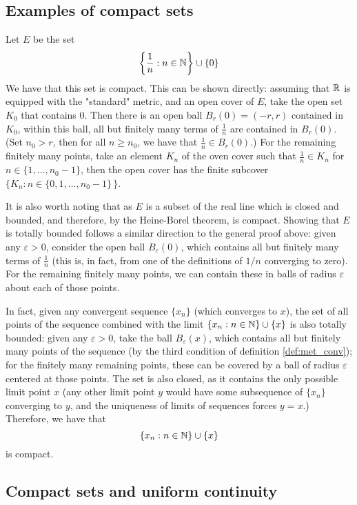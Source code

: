 \subsection{Examples of compact sets}
Let $E$ be the set \[ \left\{ \frac{1}{n} : n\in \mathbb{N} \right\} \cup \{ 0 \} \] We have that this set is compact. This can be shown directly: assuming that $\mathbb{R}$ is equipped with the "standard" metric, and an open cover of $E$, take the open set $K_{0}$ that contains $0$. Then there is an open ball \mbox{$B_{r}(0) = (-r,r)$} contained in $K_{0}$, within this ball, all but finitely many terms of $\frac{1}{n}$ are contained in $B_{r}(0)$. (Set $n_{0}>r$, then for all $n\geq n_{0}$, we have that $\frac{1}{n}\in B_{r}(0)$.) For the remaining finitely many points, take an element $K_{n}$ of the oven cover such that $\frac{1}{n} \in K_{n}$ for $n\in \{1, \ldots, n_{0}-1 \}$, then the open cover has the finite subcover \mbox{$\{K_{n} : n\in \{0,1,\ldots, n_{0} - 1 \} \, \}$}.

It is also worth noting that as $E$ is a subset of the real line which is closed and bounded, and therefore, by the Heine-Borel theorem, is compact. Showing that $E$ is totally bounded follows a similar direction to the general proof above: given any $\varepsilon > 0$, consider the open ball $B_{\varepsilon}(0)$, which contains all but finitely many terms of $\frac{1}{n}$ (this is, in fact, from one of the definitions of $1/n$ converging to zero). For the remaining finitely many points, we can contain these in balls of radius $\varepsilon$ about each of those points.

In fact, given any convergent sequence $\{ x_{n} \}$ (which converges to $x$), the set of all points of the sequence combined with the limit \mbox{$\{x_{n} : n\in \mathbb{N} \} \cup \{ x \}$} is also totally bounded: given any $\varepsilon > 0$, take the ball $B_{\varepsilon}(x)$, which contains all but finitely many points of the sequence (by the third condition of definition \ref{def:met_conv}); for the finitely many remaining points, these can be covered by a ball of radius $\varepsilon$ centered at those points. The set is also closed, as it contains the only possible limit point $x$ (any other limit point $y$ would have some subsequence of $\{ x_{n} \}$ converging to $y$, and the uniqueness of limits of sequences forces $y=x$.) Therefore, we have that \[ \{x_{n} : n\in \mathbb{N} \} \cup \{ x \} \] is compact.

\subsection{Compact sets and uniform continuity}

